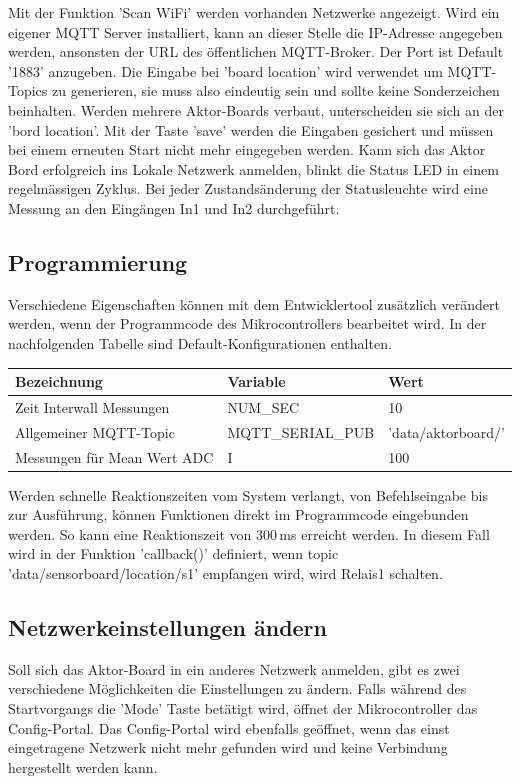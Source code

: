 Mit der Funktion 'Scan WiFi' werden vorhanden Netzwerke angezeigt. Wird ein eigener MQTT Server installiert, kann an dieser Stelle die IP-Adresse angegeben werden, ansonsten der URL des öffentlichen MQTT-Broker. Der Port ist Default '1883' anzugeben. Die Eingabe bei 'board location' wird verwendet um MQTT-Topics zu generieren, sie muss also eindeutig sein und sollte keine Sonderzeichen beinhalten. Werden mehrere Aktor-Boards verbaut, unterscheiden sie sich an der 'bord location'. Mit der Taste 'save' werden die Eingaben gesichert und müssen bei einem erneuten Start nicht mehr eingegeben werden. Kann sich das Aktor Bord erfolgreich ins Lokale Netzwerk anmelden, blinkt die Status LED in einem regelmässigen Zyklus. Bei jeder Zustandsänderung der Statusleuchte wird eine Messung an den Eingängen In1 und In2 durchgeführt.

\subsection{Programmierung}
Verschiedene Eigenschaften können mit dem Entwicklertool zusätzlich verändert werden, wenn der Programmcode des Mikrocontrollers bearbeitet wird. In der nachfolgenden Tabelle sind Default-Konfigurationen enthalten.
\begin{table}[H]
\centering
\begin{tabular}{|l|l|l|}
	\hline 
	Bezeichnung & Variable & Wert \\ 
	\hline 
	Zeit Interwall Messungen & NUM\_SEC & 10 \\ 
	\hline 
	Allgemeiner MQTT-Topic  & MQTT\_SERIAL\_PUB & 'data/aktorboard/' \\ 
	\hline 
	Messungen für Mean Wert ADC & I & 100 \\ 
	\hline  
\end{tabular} 	
\end{table}
Werden schnelle Reaktionszeiten vom System verlangt, von Befehlseingabe bis zur Ausführung, können Funktionen direkt im Programmcode eingebunden werden. So kann eine Reaktionszeit von 300\,ms erreicht werden. In diesem Fall wird in der Funktion 'callback()' definiert, wenn topic 'data/sensorboard/location/s1' empfangen wird, wird Relais1 schalten.
\subsection{Netzwerkeinstellungen ändern}
Soll sich das Aktor-Board in ein anderes Netzwerk anmelden, gibt es zwei verschiedene Möglichkeiten die Einstellungen zu ändern. Falls während des Startvorgangs die 'Mode' Taste betätigt wird, öffnet der Mikrocontroller das Config-Portal. Das Config-Portal wird ebenfalls geöffnet, wenn das einst eingetragene Netzwerk nicht mehr gefunden wird und keine Verbindung hergestellt werden kann.
